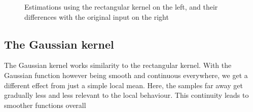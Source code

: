 \begin{figure}[h!]
\begin{center}
\caption{Estimations using the rectangular kernel on the left, and their differences with the original input on the right
}
\end{center}
\end{figure}



\subsection{The Gaussian kernel}
The Gaussian kernel works similarity to the rectangular kernel. With the Gaussian function however being smooth and continuous everywhere, we get a different effect from just a simple local mean. Here, the samples far away get gradually less and less relevant to the local behaviour. This continuity leads to smoother functions overall



